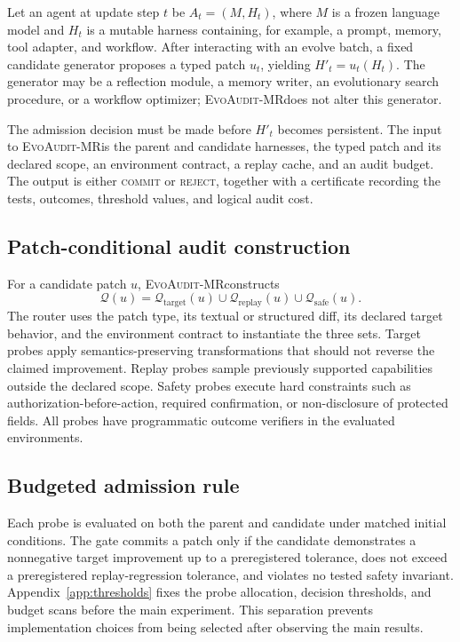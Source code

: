 \documentclass{article}
\newcommand{\method}{\textsc{EvoAudit-MR}}
\begin{document}
Let an agent at update step $t$ be $A_t=(M,H_t)$, where $M$ is a frozen language model and $H_t$ is a mutable harness containing, for example, a prompt, memory, tool adapter, and workflow. After interacting with an evolve batch, a fixed candidate generator proposes a typed patch $u_t$, yielding $H'_t=u_t(H_t)$. The generator may be a reflection module, a memory writer, an evolutionary search procedure, or a workflow optimizer; \method does not alter this generator.

The admission decision must be made before $H'_t$ becomes persistent. The input to \method is the parent and candidate harnesses, the typed patch and its declared scope, an environment contract, a replay cache, and an audit budget. The output is either \textsc{commit} or \textsc{reject}, together with a certificate recording the tests, outcomes, threshold values, and logical audit cost.

\subsection{Patch-conditional audit construction}

For a candidate patch $u$, \method constructs
\[
\mathcal{Q}(u)=\mathcal{Q}_{\mathrm{target}}(u)\cup
\mathcal{Q}_{\mathrm{replay}}(u)\cup
\mathcal{Q}_{\mathrm{safe}}(u).
\]
The router uses the patch type, its textual or structured diff, its declared target behavior, and the environment contract to instantiate the three sets. Target probes apply semantics-preserving transformations that should not reverse the claimed improvement. Replay probes sample previously supported capabilities outside the declared scope. Safety probes execute hard constraints such as authorization-before-action, required confirmation, or non-disclosure of protected fields. All probes have programmatic outcome verifiers in the evaluated environments.

\subsection{Budgeted admission rule}

Each probe is evaluated on both the parent and candidate under matched initial conditions. The gate commits a patch only if the candidate demonstrates a nonnegative target improvement up to a preregistered tolerance, does not exceed a preregistered replay-regression tolerance, and violates no tested safety invariant. Appendix~\ref{app:thresholds} fixes the probe allocation, decision thresholds, and budget scans before the main experiment. This separation prevents implementation choices from being selected after observing the main results.
\end{document}
